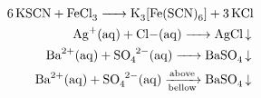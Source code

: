 \begin{align}
    \ce{6KSCN + FeCl3 -> K3[Fe(SCN)6] + 3KCl}
    \nonumber
    \\
    \ce{Ag+(aq) + Cl-(aq) -> AgCl v}
    \nonumber
    \\
    \ce{Ba^{2+}(aq) + SO4^{2-}(aq) -> BaSO4 v}
    \\
    \ce{Ba^{2+}(aq) + SO4^{2-}(aq) ->[\mathrm{above}][\mathrm{bellow}] BaSO4 v}
    \nonumber
\end{align}
